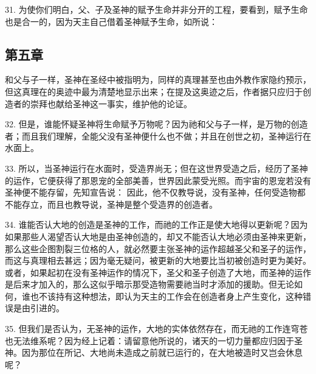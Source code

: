 31. 为使你们明白，父、子及圣神的赋予生命并非分开的工程，要看到，赋予生命也是合一的，因为天主自己借着圣神赋予生命，如所说：\par


\subsection{第五章}

和父与子一样，圣神在圣经中被指明为，同样的真理甚至也由外教作家隐约预示，但这真理在的奥迹中最为清楚地显示出来；在提及这奥迹之后，作者据只应归于创造者的崇拜也献给圣神这一事实，维护他的论证。\par

32. 但是，谁能怀疑圣神将生命赋予万物呢？因为祂和父与子一样，是万物的创造者；而且我们理解，全能父没有圣神便什么也不做；并且在创世之初，圣神运行在水面上。\par

33. 所以，当圣神运行在水面时，受造界尚无；但在这世界受造之后，经历了圣神的运作，它便获得了那恩宠的全部美善，世界因此蒙受光照。而宇宙的恩宠若没有圣神便不能存留，先知宣告说： 因此，他不仅教导说，没有圣神，任何受造物都不能存立，而且也教导说，圣神是整个受造界的创造者。\par

34. 谁能否认大地的创造是圣神的工作，而祂的工作正是使大地得以更新呢？因为如果那些人渴望否认大地是由圣神创造的，却又不能否认大地必须由圣神来更新，那么这些企图割裂三位格的人，就必然要主张圣神的运作超越圣父和圣子的运作，而这与真理相去甚远；因为毫无疑问，被更新的大地要比当初被创造时更为美好。或者，如果起初在没有圣神运作的情况下，圣父和圣子创造了大地，而圣神的运作是后来才加入的，那么这似乎暗示那受造物需要祂当时才添加的援助。但无论如何，谁也不该持有这种想法，即认为天主的工作会在创造者身上产生变化，这种错误是由引进的。\par

35. 但我们是否认为，无圣神的运作，大地的实体依然存在，而无祂的工作连穹苍也无法维系呢？因为经上记着：请留意他所说的，诸天的一切力量都应归因于圣神。因为那位在所记、大地尚未造成之前就已运行的，在大地被造时又岂会休息呢？\par

